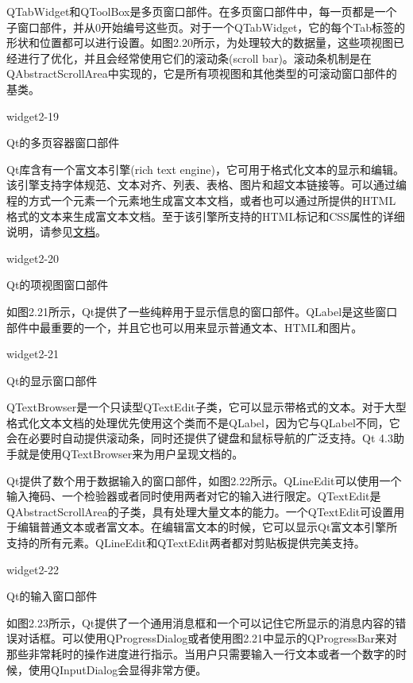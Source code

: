 \documentclass[11pt,oneside]{book}
\begin{document}
\begin{common-format}
QTabWidget和QToolBox是多页窗口部件。在多页窗口部件中，每一页都是一个子窗口部件，并从0开始编号这些页。对于一个QTabWidget，它的每个Tab标签的形状和位置都可以进行设置。如图2.20所示，为处理较大的数据量，这些项视图已经进行了优化，并且会经常使用它们的滚动条(scroll bar)。滚动条机制是在QAbstractScrollArea中实现的，它是所有项视图和其他类型的可滚动窗口部件的基类。 

\begin{linefig}[0.8]{widget2-19}
\caption{Qt的多页容器窗口部件}
\label{fig:widget2-19}
\end{linefig}


Qt库含有一个富文本引擎(rich text engine)，它可用于格式化文本的显示和编辑。该引擎支持字体规范、文本对齐、列表、表格、图片和超文本链接等。可以通过编程的方式一个元素一个元素地生成富文本文档，或者也可以通过所提供的HTML格式的文本来生成富文本文档。至于该引擎所支持的HTML标记和CSS属性的详细说明，请参见\href{http://doc.trolltech.com/4.3/richtext-html-subset.html}{文档}。

\begin{linefig}[0.8]{widget2-20}
\caption{Qt的项视图窗口部件}
\label{fig:widget2-20}
\end{linefig}

如图2.21所示，Qt提供了一些纯粹用于显示信息的窗口部件。QLabel是这些窗口部件中最重要的一个，并且它也可以用来显示普通文本、HTML和图片。

\begin{linefig}[0.8]{widget2-21}
\caption{Qt的显示窗口部件}
\label{fig:widget2-21}
\end{linefig}

QTextBrowser是一个只读型QTextEdit子类，它可以显示带格式的文本。对于大型格式化文本文档的处理优先使用这个类而不是QLabel，因为它与QLabel不同，它会在必要时自动提供滚动条，同时还提供了键盘和鼠标导航的广泛支持。Qt 4.3助手就是使用QTextBrowser来为用户呈现文档的。

Qt提供了数个用于数据输入的窗口部件，如图2.22所示。QLineEdit可以使用一个输入掩码、一个检验器或者同时使用两者对它的输入进行限定。QTextEdit是QAbstractScrollArea的子类，具有处理大量文本的能力。一个QTextEdit可设置用于编辑普通文本或者富文本。在编辑富文本的时候，它可以显示Qt富文本引擎所支持的所有元素。QLineEdit和QTextEdit两者都对剪贴板提供完美支持。

\begin{linefig}[0.8]{widget2-22}
\caption{Qt的输入窗口部件}
\label{fig:widget2-22}
\end{linefig}

如图2.23所示，Qt提供了一个通用消息框和一个可以记住它所显示的消息内容的错误对话框。可以使用QProgressDialog或者使用图2.21中显示的QProgressBar来对那些非常耗时的操作进度进行指示。当用户只需要输入一行文本或者一个数字的时候，使用QInputDialog会显得非常方便。


\end{common-format}
\end{document}
